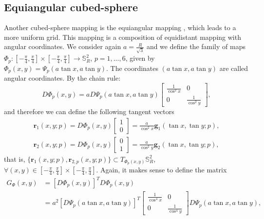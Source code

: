 \subsection{Equiangular cubed-sphere}
\label{equiangular-cs}
Another cubed-sphere mapping is the equiangular mapping \citep{ronchi:1996},
which leads to a more uniform grid. This mapping is a composition of equidistant mapping with
angular coordinates.
We consider again $a=\frac{R}{\sqrt{3}}$
and we define the family of maps
$\Phi_{p}: [-\frac{\pi}{4},\frac{\pi}{4}] 
\times [-\frac{\pi}{4},\frac{\pi}{4}] 
\to \mathbb{S}^2_R$, $p=1, \ldots, 6$,
given by $\Phi_{p}(x,y) = \Psi_{p}(a\tan{x}, a\tan{y})$.
The coordinates $(a\tan{x}, a\tan{y})$ are called angular coordinates.
By the chain rule:
\begin{equation}
	D\Phi_{p}(x,y) = a
	D\Psi_{p}(a\tan{x}, a\tan{y})
	\begin{bmatrix}
		\frac{1}{\cos^2 x} & 0 \\ 
		0 & \frac{1}{\cos^2 y} 
	\end{bmatrix},
\end{equation}
and therefore we can define the following tangent vectors
\begin{align}
	\boldsymbol{r}_{1}(x,y;p) = D\Phi_{p}(x,y)
	\begin{bmatrix}
		 1 \\
		 0
	\end{bmatrix}
	= \frac{a}{\cos^2 x}
	\boldsymbol{g}_{1}(\tan{x}, \tan{y}; p)
	,\\
	\boldsymbol{r}_{2}(x, y ;p) = D\Phi_{p}(x,y)
	\begin{bmatrix}
		 0 \\
		 1
	\end{bmatrix}
	= \frac{a}{\cos^2 y}
	\boldsymbol{g}_{2}(\tan{x}, \tan{y}; p),
\end{align}
that is, $\{\boldsymbol{r}_{1}(x,y;p),\boldsymbol{r}_{2,p}(x,y;p)\} \subset T_{\Phi_p(x,y)}
\mathbb{S}_{R}^2$, $\forall (x,y) \in 
[-\frac{\pi}{4},\frac{\pi}{4}] 
\times [-\frac{\pi}{4},\frac{\pi}{4}]$.
Again, it makes sense to define the matrix 
\begin{align}
	G_{\Phi}(x,y) &= [D\Phi_{p}(x,y)]^TD\Phi_{p}(x,y) \\
	&= a^2
	[D\Psi_{p}(a\tan{x},a\tan{y})]^T
	\begin{bmatrix}
		\frac{1}{\cos^4 x} & 0 \\ 
		0 & \frac{1}{\cos^4 y} 
	\end{bmatrix}
	D\Psi_{p}(a\tan{x}, a\tan{y}),
\end{align}
